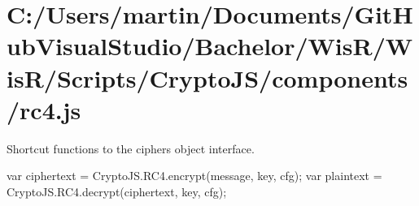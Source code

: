 \hypertarget{_c_1_2_users_2martin_2_documents_2_git_hub_visual_studio_2_bachelor_2_wis_r_2_wis_r_2_scripts_2_a7aef29039b205bc09138aca000fc420}{}\section{C\+:/\+Users/martin/\+Documents/\+Git\+Hub\+Visual\+Studio/\+Bachelor/\+Wis\+R/\+Wis\+R/\+Scripts/\+Crypto\+J\+S/components/rc4.\+js}
Shortcut functions to the cipher\textquotesingle{}s object interface.

\begin{DoxyVerb}var ciphertext = CryptoJS.RC4.encrypt(message, key, cfg);
var plaintext  = CryptoJS.RC4.decrypt(ciphertext, key, cfg);\end{DoxyVerb}



